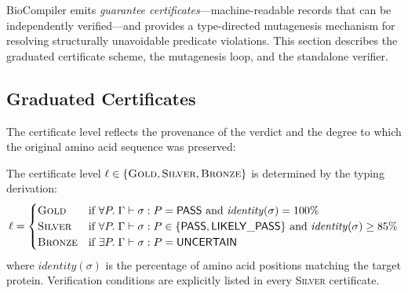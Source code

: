 \documentclass[acmsmall,review,anonymous]{acmart}
\newcommand{\PASS}{\ensuremath{\mathsf{PASS}}\xspace}
\newcommand{\UNCERTAIN}{\ensuremath{\mathsf{UNCERTAIN}}\xspace}
\newcommand{\LIKELYPASS}{\ensuremath{\mathsf{LIKELY\_PASS}}\xspace}
\newcommand{\seq}{\sigma}
\newcommand{\pred}{P}
\newcommand{\judg}[3]{#1 \vdash #2 : #3}
\newcommand{\GOLD}{\textsc{Gold}\xspace}
\newcommand{\SILVER}{\textsc{Silver}\xspace}
\newcommand{\BRONZE}{\textsc{Bronze}\xspace}
\begin{document}
BioCompiler emits \emph{guarantee certificates}---machine-readable
records that can be independently verified---and provides a
type-directed mutagenesis mechanism for resolving structurally
unavoidable predicate violations.
This section describes the graduated certificate scheme, the
mutagenesis loop, and the standalone verifier.

\subsection{Graduated Certificates}\label{sec:certs}

The certificate level reflects the provenance of the verdict and the
degree to which the original amino acid sequence was preserved:

\begin{definition}
The certificate level $\ell \in \{\GOLD, \SILVER, \BRONZE\}$ is
determined by the typing derivation:
\[
  \ell =
  \begin{cases}
    \GOLD & \text{if } \forall \pred.\;
            \judg{\Gamma}{\seq}{\pred} = \PASS
            \text{ and } \mathit{identity}(\seq) = 100\% \\
    \SILVER & \text{if } \forall \pred.\;
              \judg{\Gamma}{\seq}{\pred} \in \{\PASS, \LIKELYPASS\}
              \text{ and } \mathit{identity}(\seq) \ge 85\% \\
    \BRONZE & \text{if } \exists \pred.\;
              \judg{\Gamma}{\seq}{\pred} = \UNCERTAIN
  \end{cases}
\]
where $\mathit{identity}(\seq)$ is the percentage of amino acid
positions matching the target protein.
Verification conditions are explicitly listed in every \SILVER{}
certificate.
\end{definition}
\end{document}
